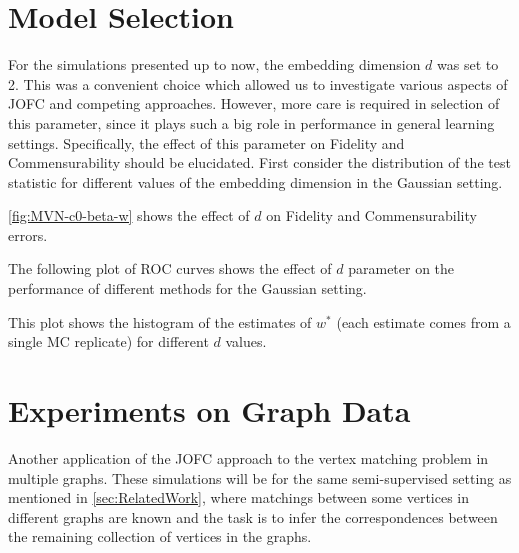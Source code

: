\documentclass[11pt]{article} %
\begin{document}
\section{Model Selection}
For the simulations presented up to now, the embedding dimension $d$ was set to 2. This was a convenient choice which allowed us to investigate various aspects of JOFC and competing approaches.
However,  more care is required in selection of this parameter, since it plays such a big role in performance in general learning settings. Specifically, the effect of this parameter on Fidelity and Commensurability should be elucidated.
First consider the distribution of the test statistic for different values of the embedding dimension in the Gaussian setting.


\ref{fig:MVN-c0-beta-w} shows the effect of $d$ on Fidelity and Commensurability errors.

The following plot of ROC curves\cite{d-ROC} shows the effect of $d$ parameter on the performance of different methods for the Gaussian setting. 



This plot shows the histogram of the estimates of $ w^{*} $ (each estimate comes from a single MC replicate)  
for different $ d $ values.





\section{Experiments on Graph Data}

Another application of  the JOFC approach to  the vertex matching problem in multiple graphs. These simulations will be for the same semi-supervised setting as mentioned in \ref{sec:RelatedWork}, where matchings between some vertices in different graphs are known 
  and the task is to infer the correspondences between the remaining collection of vertices in the graphs.
\end{document}
